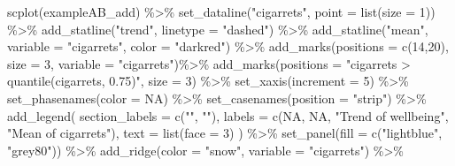 \documentclass[
  letterpaper,
  DIV=11,
  numbers=noendperiod]{scrreprt}
\newenvironment{Shaded}{\begin{snugshade}}{\end{snugshade}}
\newcommand{\AttributeTok}[1]{\textcolor[rgb]{0.40,0.45,0.13}{#1}}
\newcommand{\ConstantTok}[1]{\textcolor[rgb]{0.56,0.35,0.01}{#1}}
\newcommand{\DecValTok}[1]{\textcolor[rgb]{0.68,0.00,0.00}{#1}}
\newcommand{\FunctionTok}[1]{\textcolor[rgb]{0.28,0.35,0.67}{#1}}
\newcommand{\NormalTok}[1]{\textcolor[rgb]{0.00,0.23,0.31}{#1}}
\newcommand{\SpecialCharTok}[1]{\textcolor[rgb]{0.37,0.37,0.37}{#1}}
\newcommand{\StringTok}[1]{\textcolor[rgb]{0.13,0.47,0.30}{#1}}
\begin{document}
\begin{Shaded}
\begin{Highlighting}[]
\FunctionTok{scplot}\NormalTok{(exampleAB\_add) }\SpecialCharTok{\%\textgreater{}\%}
  \FunctionTok{set\_dataline}\NormalTok{(}\StringTok{"cigarrets"}\NormalTok{, }\AttributeTok{point =} \FunctionTok{list}\NormalTok{(}\AttributeTok{size =} \DecValTok{1}\NormalTok{)) }\SpecialCharTok{\%\textgreater{}\%}
  \FunctionTok{add\_statline}\NormalTok{(}\StringTok{"trend"}\NormalTok{, }\AttributeTok{linetype =} \StringTok{"dashed"}\NormalTok{) }\SpecialCharTok{\%\textgreater{}\%}
  \FunctionTok{add\_statline}\NormalTok{(}\StringTok{"mean"}\NormalTok{, }\AttributeTok{variable =} \StringTok{"cigarrets"}\NormalTok{, }\AttributeTok{color =} \StringTok{"darkred"}\NormalTok{) }\SpecialCharTok{\%\textgreater{}\%}
  \FunctionTok{add\_marks}\NormalTok{(}\AttributeTok{positions =} \FunctionTok{c}\NormalTok{(}\DecValTok{14}\NormalTok{,}\DecValTok{20}\NormalTok{), }\AttributeTok{size =} \DecValTok{3}\NormalTok{, }\AttributeTok{variable =} \StringTok{"cigarrets"}\NormalTok{)}\SpecialCharTok{\%\textgreater{}\%}
  \FunctionTok{add\_marks}\NormalTok{(}\AttributeTok{positions =} \StringTok{"cigarrets \textgreater{} quantile(cigarrets, 0.75)"}\NormalTok{, }\AttributeTok{size =} \DecValTok{3}\NormalTok{) }\SpecialCharTok{\%\textgreater{}\%}
  \FunctionTok{set\_xaxis}\NormalTok{(}\AttributeTok{increment =} \DecValTok{5}\NormalTok{) }\SpecialCharTok{\%\textgreater{}\%}
  \FunctionTok{set\_phasenames}\NormalTok{(}\AttributeTok{color =} \ConstantTok{NA}\NormalTok{) }\SpecialCharTok{\%\textgreater{}\%}
  \FunctionTok{set\_casenames}\NormalTok{(}\AttributeTok{position =} \StringTok{"strip"}\NormalTok{) }\SpecialCharTok{\%\textgreater{}\%}
  \FunctionTok{add\_legend}\NormalTok{(}
    \AttributeTok{section\_labels =} \FunctionTok{c}\NormalTok{(}\StringTok{""}\NormalTok{, }\StringTok{""}\NormalTok{),}
    \AttributeTok{labels =} \FunctionTok{c}\NormalTok{(}\ConstantTok{NA}\NormalTok{, }\ConstantTok{NA}\NormalTok{, }\StringTok{"Trend of wellbeing"}\NormalTok{, }\StringTok{"Mean of cigarrets"}\NormalTok{),}
    \AttributeTok{text =} \FunctionTok{list}\NormalTok{(}\AttributeTok{face =} \DecValTok{3}\NormalTok{)}
\NormalTok{  ) }\SpecialCharTok{\%\textgreater{}\%}
  \FunctionTok{set\_panel}\NormalTok{(}\AttributeTok{fill =} \FunctionTok{c}\NormalTok{(}\StringTok{"lightblue"}\NormalTok{, }\StringTok{"grey80"}\NormalTok{)) }\SpecialCharTok{\%\textgreater{}\%}
  \FunctionTok{add\_ridge}\NormalTok{(}\AttributeTok{color =} \StringTok{"snow"}\NormalTok{, }\AttributeTok{variable =} \StringTok{"cigarrets"}\NormalTok{) }\SpecialCharTok{\%\textgreater{}\%}

\end{Highlighting}
\end{Shaded}
\end{document}

